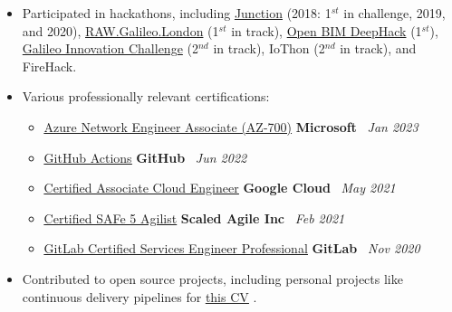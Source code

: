 \documentclass[11pt,a4paper,sans]{moderncv}
\newcommand{\inlineLink}[2]{%
    \underline{\href{#1}{#2}}%
}
\begin{document}
{		
	\begin{itemize}[label=\textbullet]
		\item Participated in hackathons, including 
		      \href{https://www.hackjunction.com/}{Junction} (2018: 1$^{st}$ in challenge, 2019, and 2020), 
		      \href{https://raw.galileo.london/}{RAW.Galileo.London} (1$^{st}$ in track), 
		      \href{https://ultrahack.org/open-bim-deephack}{Open BIM DeepHack} (1$^{st}$), 
		      \href{https://ultrahack.org/galileoinnovationchallenge}{Galileo Innovation Challenge} (2$^{nd}$ in track), 
		      IoThon (2$^{nd}$ in track), and 
		      FireHack.
		      		      		          
		\item Various professionally relevant certifications:
		      {
		      	\newcommand{\certificateEntry}[4]{%
		      		\item \inlineLink{#1}{#2} \hfill {\bfseries #3} \ {\itshape #4}%
		      	}
		      			      			      	
		      	\begin{itemize}
		      		\certificateEntry
		      		{https://www.credly.com/badges/f2b4e861-75b4-43cd-8cb5-98835bf5a2d3/public_url}
		      		{Azure Network Engineer Associate (AZ-700)}
		      		{Microsoft}
		      		{Jan 2023}
		      				      				      		        
		      		\certificateEntry
		      		{https://www.credly.com/badges/4d91abb3-5f49-4f22-a0cc-d8d4f6841738/public_url}
		      		{GitHub Actions}
		      		{GitHub}
		      		{Jun 2022}
		      				      				      		        
		      		\certificateEntry
		      		{https://www.credential.net/3e7c1e77-e591-40d3-88ff-67494b422cfc?key=9d07014f6e1465d00a525436cfdb53cc8b7fd70ae353b12ea668dee572d2c797}
		      		{Certified Associate Cloud Engineer}
		      		{Google Cloud}
		      		{May 2021}
		      				      				      		        
		      		\certificateEntry
		      		{https://www.youracclaim.com/badges/deb40f91-a445-4e73-aed5-714988eefd80/}
		      		{Certified SAFe 5 Agilist}
		      		{Scaled Agile Inc}
		      		{Feb 2021}
		      				      				      		        
		      		\certificateEntry
		      		{https://www.credly.com/badges/d9372b90-3057-4429-b61f-e8cd4c2b6615/public_url}
		      		{GitLab Certified Services Engineer Professional}
		      		{GitLab}
		      		{Nov 2020}
		      	\end{itemize}
		      }
		\item Contributed to open source projects, including personal projects like continuous delivery pipelines for \inlineLink{https://github.com/addono/cv}{this CV}.
	\end{itemize}} 
\end{document}
